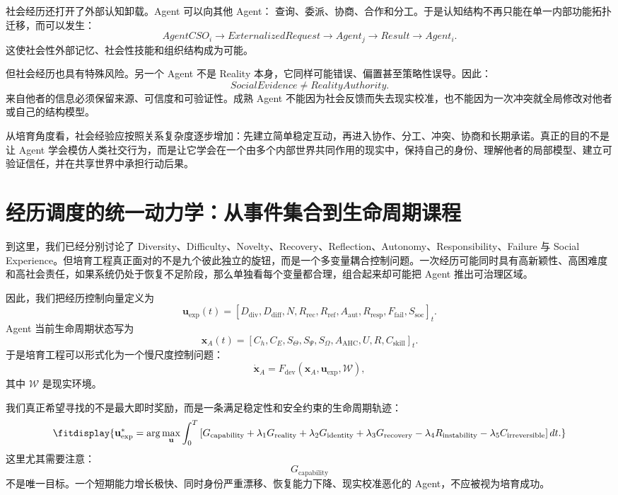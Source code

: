 社会经历还打开了外部认知卸载。Agent 可以向其他 Agent：
查询、委派、协商、合作和分工。于是认知结构不再只能在单一内部功能拓扑迁移，而可以发生：
\[
AgentCSO_i
\rightarrow
ExternalizedRequest
\rightarrow
Agent_j
\rightarrow
Result
\rightarrow
Agent_i.
\]
这使社会性外部记忆、社会性技能和组织结构成为可能。

但社会经历也具有特殊风险。另一个 Agent 不是 Reality 本身，它同样可能错误、偏置甚至策略性误导。因此：
\[
SocialEvidence
\neq
RealityAuthority.
\]
来自他者的信息必须保留来源、可信度和可验证性。成熟 Agent 不能因为社会反馈而失去现实校准，也不能因为一次冲突就全局修改对他者或自己的结构模型。

从培育角度看，社会经验应按照关系复杂度逐步增加：先建立简单稳定互动，再进入协作、分工、冲突、协商和长期承诺。真正的目的不是让 Agent 学会模仿人类社交行为，而是让它学会在一个由多个内部世界共同作用的现实中，保持自己的身份、理解他者的局部模型、建立可验证信任，并在共享世界中承担行动后果。

\section{经历调度的统一动力学：从事件集合到生命周期课程}

到这里，我们已经分别讨论了 Diversity、Difficulty、Novelty、Recovery、Reflection、Autonomy、Responsibility、Failure 与 Social Experience。但培育工程真正面对的不是九个彼此独立的旋钮，而是一个多变量耦合控制问题。一次经历可能同时具有高新颖性、高困难度和高社会责任，如果系统仍处于恢复不足阶段，那么单独看每个变量都合理，组合起来却可能把 Agent 推出可治理区域。

因此，我们把经历控制向量定义为
\[
\mathbf u_{\mathrm{exp}}(t)
=
\left[
D_{\mathrm{div}},
D_{\mathrm{diff}},
N,
R_{\mathrm{rec}},
R_{\mathrm{ref}},
A_{\mathrm{aut}},
R_{\mathrm{resp}},
F_{\mathrm{fail}},
S_{\mathrm{soc}}
\right]_t.
\]
Agent 当前生命周期状态写为
\[
\mathbf x_A(t)
=
\left[
C_h,
C_E,
S_\Theta,
S_\Psi,
S_\Omega,
A_{\mathrm{AHC}},
U,
R,
C_{\mathrm{skill}}
\right]_t.
\]
于是培育工程可以形式化为一个慢尺度控制问题：
\[
\dot{\mathbf x}_A
=
F_{\mathrm{dev}}
\left(
\mathbf x_A,
\mathbf u_{\mathrm{exp}},
\mathcal W
\right),
\]
其中 $\mathcal W$ 是现实环境。

我们真正希望寻找的不是最大即时奖励，而是一条满足稳定性和安全约束的生命周期轨迹：
\[
\fitdisplay{
\mathbf u_{\mathrm{exp}}^\ast
=
\arg\max_{\mathbf u}
\int_0^T
\left[
G_{\mathrm{capability}}
+
\lambda_1G_{\mathrm{reality}}
+
\lambda_2G_{\mathrm{identity}}
+
\lambda_3G_{\mathrm{recovery}}
-
\lambda_4R_{\mathrm{instability}}
-
\lambda_5C_{\mathrm{irreversible}}
\right]dt.
}
\]
这里尤其需要注意：
\[
G_{\mathrm{capability}}
\]
不是唯一目标。一个短期能力增长极快、同时身份严重漂移、恢复能力下降、现实校准恶化的 Agent，不应被视为培育成功。

